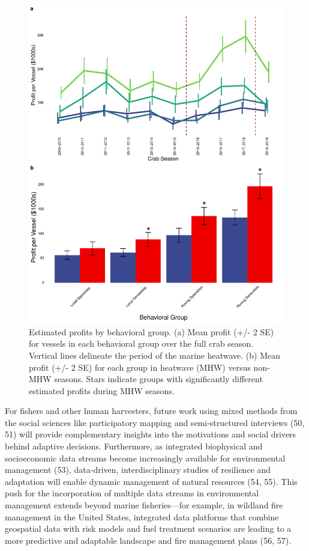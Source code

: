 \documentclass[9pt,twocolumn,twoside,lineno]{pnas-new}
\begin{document}
\begin{figure}%
\includegraphics[width=\linewidth]{fig_profits.pdf}
\caption{Estimated profits by behavioral group. (a) Mean profit (+/- 2 SE) for vessels in each behavioral group over the full crab season. Vertical lines delineate the period of the marine heatwave. (b) Mean profit (+/- 2 SE) for each group in heatwave (MHW) versus non-MHW seasons. Stars indicate groups with significantly different estimated profits during MHW seasons.}
\label{fig:profits}
\end{figure}

For fishers and other human harvesters, future work using mixed methods
from the social sciences like participatory mapping and semi-structured
interviews (50, 51) will provide complementary insights into the
motivations and social drivers behind adaptive decisions. Furthermore,
as integrated biophysical and socioeconomic data streams become
increasingly available for environmental management (53), data-driven,
interdisciplinary studies of resilience and adaptation will enable
dynamic management of natural resources (54, 55). This push for the
incorporation of multiple data streams in environmental management
extends beyond marine fisheries---for example, in wildland fire
management in the United States, integrated data platforms that combine
geospatial data with risk models and fuel treatment scenarios are
leading to a more predictive and adaptable landscape and fire management
plans (56, 57).
\end{document}
